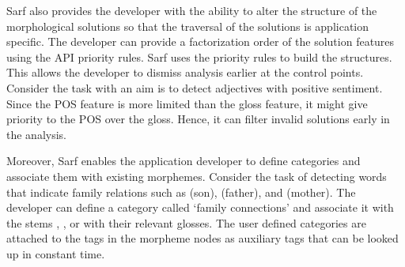 Sarf also provides the developer with the ability to alter 
the structure of the morphological solutions so 
that the traversal of the solutions is application specific. 
The developer can provide a factorization order 
of the solution features using the API priority rules. 
Sarf uses the priority rules to build the structures. 
This allows the developer to dismiss analysis earlier at the control points. 
Consider the task with an aim is to detect adjectives 
with positive sentiment. 
Since the POS feature is more limited than the gloss feature, 
it might give priority to the POS over the gloss. 
Hence, it can filter invalid solutions early in 
the analysis.

Moreover, Sarf enables the application developer to define 
categories and associate them with existing morphemes. 
Consider the task of detecting words that indicate 
family relations such as  (son),  (father), 
and  (mother). 
The developer can define a category called `family connections' 
and associate it with the stems , ,  
or with their relevant glosses. 
The user defined categories are attached to the tags in the 
morpheme nodes as auxiliary tags that can be looked up in constant time. 

